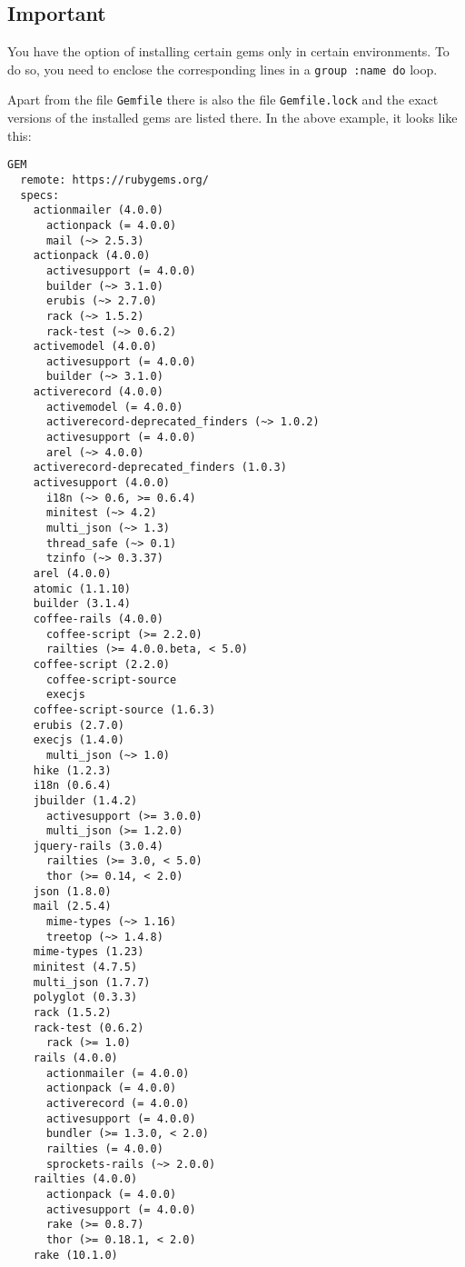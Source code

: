 \documentclass[a4paper]{book}
\begin{document}
\subsection{Important}\label{important-13}

You have the option of installing certain gems only in certain environments. To do so, you need to enclose the corresponding lines in a \texttt{group :name do} loop.

Apart from the file \texttt{Gemfile} there is also the file \texttt{Gemfile.lock} and the exact versions of the installed gems are listed there. In the above example, it looks like this:

\begin{shaded}\begin{verbatim}
GEM
  remote: https://rubygems.org/
  specs:
    actionmailer (4.0.0)
      actionpack (= 4.0.0)
      mail (~> 2.5.3)
    actionpack (4.0.0)
      activesupport (= 4.0.0)
      builder (~> 3.1.0)
      erubis (~> 2.7.0)
      rack (~> 1.5.2)
      rack-test (~> 0.6.2)
    activemodel (4.0.0)
      activesupport (= 4.0.0)
      builder (~> 3.1.0)
    activerecord (4.0.0)
      activemodel (= 4.0.0)
      activerecord-deprecated_finders (~> 1.0.2)
      activesupport (= 4.0.0)
      arel (~> 4.0.0)
    activerecord-deprecated_finders (1.0.3)
    activesupport (4.0.0)
      i18n (~> 0.6, >= 0.6.4)
      minitest (~> 4.2)
      multi_json (~> 1.3)
      thread_safe (~> 0.1)
      tzinfo (~> 0.3.37)
    arel (4.0.0)
    atomic (1.1.10)
    builder (3.1.4)
    coffee-rails (4.0.0)
      coffee-script (>= 2.2.0)
      railties (>= 4.0.0.beta, < 5.0)
    coffee-script (2.2.0)
      coffee-script-source
      execjs
    coffee-script-source (1.6.3)
    erubis (2.7.0)
    execjs (1.4.0)
      multi_json (~> 1.0)
    hike (1.2.3)
    i18n (0.6.4)
    jbuilder (1.4.2)
      activesupport (>= 3.0.0)
      multi_json (>= 1.2.0)
    jquery-rails (3.0.4)
      railties (>= 3.0, < 5.0)
      thor (>= 0.14, < 2.0)
    json (1.8.0)
    mail (2.5.4)
      mime-types (~> 1.16)
      treetop (~> 1.4.8)
    mime-types (1.23)
    minitest (4.7.5)
    multi_json (1.7.7)
    polyglot (0.3.3)
    rack (1.5.2)
    rack-test (0.6.2)
      rack (>= 1.0)
    rails (4.0.0)
      actionmailer (= 4.0.0)
      actionpack (= 4.0.0)
      activerecord (= 4.0.0)
      activesupport (= 4.0.0)
      bundler (>= 1.3.0, < 2.0)
      railties (= 4.0.0)
      sprockets-rails (~> 2.0.0)
    railties (4.0.0)
      actionpack (= 4.0.0)
      activesupport (= 4.0.0)
      rake (>= 0.8.7)
      thor (>= 0.18.1, < 2.0)
    rake (10.1.0)

\end{verbatim}
\end{shaded}
\end{document}
